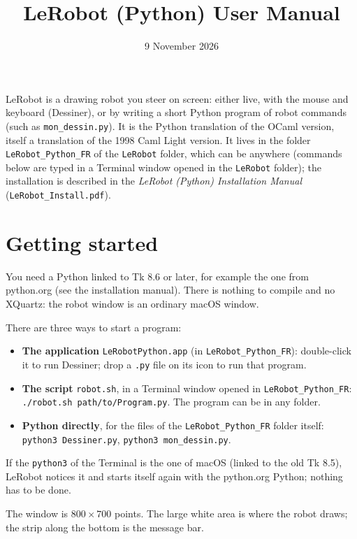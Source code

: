 \documentclass[11pt,a4paper]{article}
\title{LeRobot (Python) User Manual}
\author{}
\date{9 November 2026}
\newcommand{\kbd}[1]{\texttt{#1}}
\begin{document}
\maketitle

LeRobot is a drawing robot you steer on screen: either live, with the mouse
and keyboard (Dessiner), or by writing a short Python program of robot
commands (such as \kbd{mon\_dessin.py}). It is the Python translation of
the OCaml version, itself a translation of the 1998 Caml Light version. It
lives in the folder \kbd{LeRobot\_Python\_FR} of the \kbd{LeRobot} folder,
which can be anywhere (commands below are typed in a Terminal window
opened in the \kbd{LeRobot} folder); the
installation is described in the \emph{LeRobot (Python) Installation
Manual} (\kbd{LeRobot\_Install.pdf}).

\tableofcontents

\section{Getting started}

You need a Python linked to Tk 8.6 or later, for example the one from
python.org (see the installation manual). There is nothing to compile and
no XQuartz: the robot window is an ordinary macOS window.

There are three ways to start a program:
\begin{itemize}
\item \textbf{The application} \kbd{LeRobotPython.app} (in
  \kbd{LeRobot\_Python\_FR}): double-click it to run Dessiner; drop a \kbd{.py}
  file on its icon to run that program.
\item \textbf{The script} \kbd{robot.sh}, in a Terminal window opened in
  \kbd{LeRobot\_Python\_FR}: \kbd{./robot.sh path/to/Program.py}. The program
  can be in any folder.
\item \textbf{Python directly}, for the files of the \kbd{LeRobot\_Python\_FR}
  folder itself: \kbd{python3 Dessiner.py}, \kbd{python3 mon\_dessin.py}.
\end{itemize}
If the \kbd{python3} of the Terminal is the one of macOS (linked to the old
Tk 8.5), LeRobot notices it and starts itself again with the python.org
Python; nothing has to be done.

The window is $800 \times 700$ points. The large white area is where the
robot draws; the strip along the bottom is the message bar.
\end{document}
